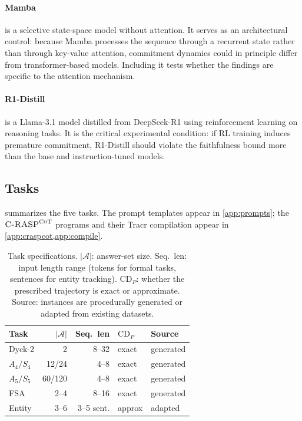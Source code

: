 \documentclass[11pt]{article}
\newcommand{\CDP}{\mathrm{CD}_{P}}
\newcommand{\CRASPCoT}{\textsc{C-RASP}^{\textsc{CoT}}}
\begin{document}
\paragraph{Mamba} is a selective state-space model without attention. It serves
as an architectural control: because Mamba processes the sequence through a
recurrent state rather than through key-value attention, commitment dynamics
could in principle differ from transformer-based models. Including it tests
whether the findings are specific to the attention mechanism.

\paragraph{R1-Distill} is a Llama-3.1 model distilled from DeepSeek-R1 using
reinforcement learning on reasoning tasks. It is the critical experimental
condition: if RL training induces premature commitment, R1-Distill should
violate the faithfulness bound more than the base and instruction-tuned models.

\subsection{Tasks}
\label{app:exp-tasks}

 summarizes the five tasks. The prompt templates appear in
\cref{app:prompts}; the $\CRASPCoT$ programs and their Tracr compilation appear
in \cref{app:craspcot,app:compile}.

\begin{table}[t]
\centering\small
\setlength{\tabcolsep}{3pt}
\begin{tabular}{@{}lrrlp{2.5cm}@{}}
\toprule
Task & $|\mathcal{A}|$ & Seq.\ len & $\CDP$ & Source \\
\midrule
Dyck-2    & 2   & 8--32   & exact  & generated \\
$A_4/S_4$ & 12/24 & 4--8  & exact  & generated \\
$A_5/S_5$ & 60/120 & 4--8 & exact  & generated \\
FSA       & 2--4 & 8--16  & exact  & generated \\
Entity    & 3--6 & 3--5 sent. & approx & adapted \\
\bottomrule
\end{tabular}
\caption{Task specifications. $|\mathcal{A}|$: answer-set size. Seq.\ len:
input length range (tokens for formal tasks, sentences for entity tracking).
$\CDP$: whether the prescribed trajectory is exact or approximate. Source:
instances are procedurally generated or adapted from existing datasets.}
\label{tab:task-specs}
\end{table}
\end{document}
